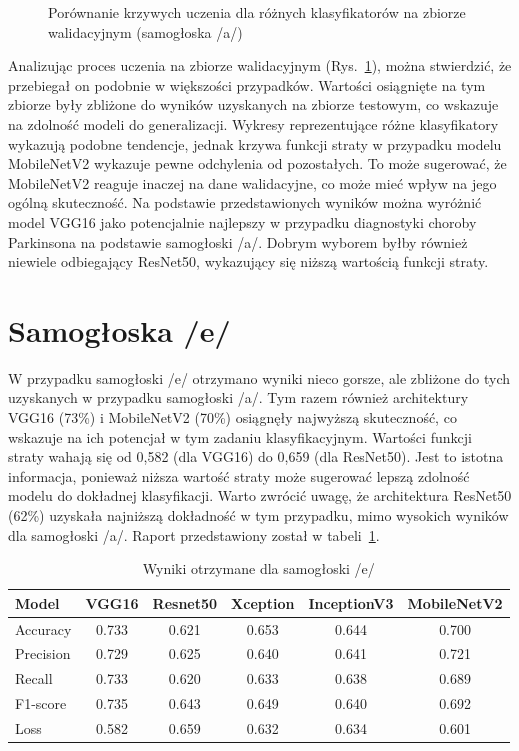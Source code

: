 \begin{figure}[ht]
    \caption{Porównanie krzywych uczenia dla różnych klasyfikatorów na zbiorze walidacyjnym (samogłoska /a/)}
    \label{fig:a_results}
\end{figure}

Analizując proces uczenia na zbiorze walidacyjnym (Rys.~\ref{fig:a_results}),  można stwierdzić, że przebiegał on podobnie w większości przypadków.
Wartości osiągnięte na tym zbiorze były zbliżone do wyników uzyskanych na zbiorze testowym, co wskazuje na zdolność modeli do generalizacji.
Wykresy reprezentujące różne klasyfikatory wykazują podobne tendencje, jednak krzywa funkcji straty w przypadku modelu MobileNetV2 wykazuje pewne odchylenia od pozostałych.
To może sugerować, że MobileNetV2 reaguje inaczej na dane walidacyjne, co może mieć wpływ na jego ogólną skuteczność.
Na podstawie przedstawionych wyników można wyróżnić model VGG16 jako potencjalnie najlepszy w przypadku diagnostyki choroby Parkinsona na podstawie samogłoski /a/.
Dobrym wyborem byłby również niewiele odbiegający ResNet50, wykazujący się niższą wartością funkcji straty.

\section{Samogłoska /e/}
\label{sec:samogloska-e}

W przypadku samogłoski /e/ otrzymano wyniki nieco gorsze, ale zbliżone do tych uzyskanych w przypadku samogłoski /a/.
Tym razem również architektury VGG16 (73\%) i MobileNetV2 (70\%) osiągnęły najwyższą skuteczność, co wskazuje na ich potencjał w tym zadaniu klasyfikacyjnym.
Wartości funkcji straty wahają się od 0,582 (dla VGG16) do 0,659 (dla ResNet50).
Jest to istotna informacja, ponieważ niższa wartość straty może sugerować lepszą zdolność modelu do dokładnej klasyfikacji.
Warto zwrócić uwagę, że architektura ResNet50 (62\%) uzyskała najniższą dokładność w tym przypadku, mimo wysokich wyników dla samogłoski /a/.
Raport przedstawiony został w tabeli~\ref{tab:wyniki-e}.

\begin{table}[ht]
\centering
\caption{Wyniki otrzymane dla samogłoski /e/}
\label{tab:wyniki-e}
\begin{tabular}{|l|c|c|c|c|c|}
\hline
\textbf{Model} &\textbf{VGG16} &\textbf{Resnet50} &\textbf{Xception} &\textbf{InceptionV3} &\textbf{MobileNetV2} \\ \hline
    Accuracy &0.733 &0.621 &0.653 &0.644 &0.700 \\ \hline
    Precision &0.729 &0.625 &0.640 &0.641 &0.721 \\ \hline
    Recall &0.733 &0.620 &0.633 &0.638 &0.689 \\ \hline
    F1-score &0.735 &0.643 &0.649 &0.640 &0.692 \\ \hline
    Loss &0.582 &0.659 &0.632 &0.634 &0.601 \\ \hline
\end{tabular}
\end{table}


